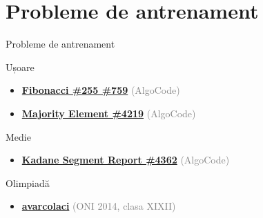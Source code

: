 \documentclass{beamer}
\begin{document}
\section{Probleme de antrenament}

\begin{frame}{Probleme de antrenament}
  \begin{block}{Ușoare}
    \begin{itemize}\footnotesize\itemsep0pt
      \item \href{https://code.algolymp.com/problems/759}{\textbf{Fibonacci \#255 \#759}} {\footnotesize\textcolor{gray}{(AlgoCode)}}
      \item \href{https://code.algolymp.com/problems/4219}{\textbf{Majority Element \#4219}} {\footnotesize\textcolor{gray}{(AlgoCode)}}
    \end{itemize}
  \end{block}
  \vspace{-4pt}
  \begin{block}{Medie}
    \begin{itemize}\footnotesize\itemsep0pt
      \item \href{https://code.algolymp.com/problems/4362}{\textbf{Kadane Segment Report \#4362}} {\footnotesize\textcolor{gray}{(AlgoCode)}}
    \end{itemize}
  \end{block}
  \vspace{-4pt}
  \begin{block}{Olimpiadă}
    \begin{itemize}\footnotesize\itemsep0pt
      \item \href{https://code.algolymp.com/problems/226}{\textbf{avarcolaci}} {\footnotesize\textcolor{gray}{(ONI 2014, clasa XI\textendash{}XII)}}
    \end{itemize}
  \end{block}
\end{frame}
\end{document}
